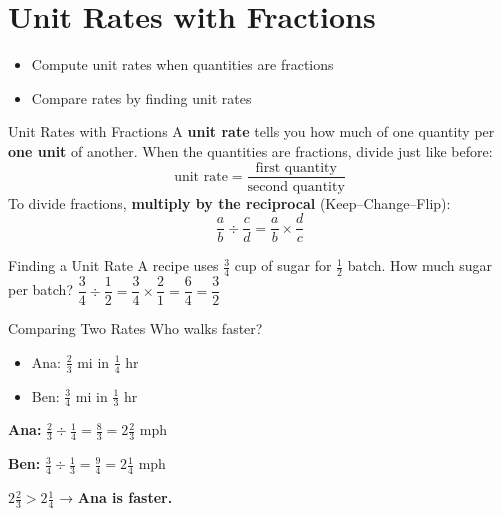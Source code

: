 \section{Unit Rates with Fractions}

\begin{learningGoals}
\begin{itemize}
    \item Compute unit rates when quantities are fractions
    \item Compare rates by finding unit rates
\end{itemize}
\end{learningGoals}

\begin{conceptBox}{Unit Rates with Fractions}
A \textbf{unit rate} tells you how much of one quantity per \textbf{one unit} of another.
When the quantities are fractions, divide just like before:
$$\text{unit rate} = \frac{\text{first quantity}}{\text{second quantity}}$$
To divide fractions, \textbf{multiply by the reciprocal} (Keep--Change--Flip):
$$\frac{a}{b} \div \frac{c}{d} = \frac{a}{b} \times \frac{d}{c}$$
\end{conceptBox}

\begin{workedExample}{Finding a Unit Rate}
A recipe uses $\frac{3}{4}$ cup of sugar for $\frac{1}{2}$ batch. How much sugar per batch?
\solutionLabel
$\dfrac{3}{4} \div \dfrac{1}{2} = \dfrac{3}{4} \times \dfrac{2}{1} = \dfrac{6}{4} = \dfrac{3}{2}$
\end{workedExample}

\begin{sideBySideExample}{Comparing Two Rates}
Who walks faster?
\begin{itemize}[leftmargin=*]
    \item Ana: $\frac{2}{3}$ mi in $\frac{1}{4}$ hr
    \item Ben: $\frac{3}{4}$ mi in $\frac{1}{3}$ hr
\end{itemize}
\tcblower
\textbf{Ana:} $\frac{2}{3} \div \frac{1}{4} = \frac{8}{3} = 2\frac{2}{3}$ mph

\textbf{Ben:} $\frac{3}{4} \div \frac{1}{3} = \frac{9}{4} = 2\frac{1}{4}$ mph

$2\frac{2}{3} > 2\frac{1}{4}$ → \textbf{Ana is faster.}
\end{sideBySideExample}


